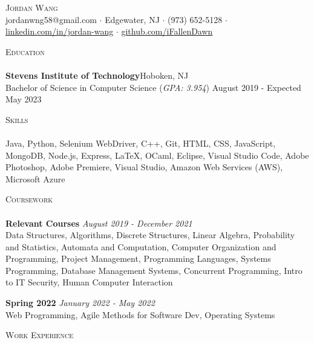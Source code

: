 \documentclass[10pt]{article}
\newcommand{\lineunder} {
    \vspace*{-8pt} \\
    \hspace*{-18pt} \hrulefill \\
}
\newcommand{\header} [1] {
    {\hspace*{-18pt}\vspace*{6pt} \textsc{#1}}
    \vspace*{-6pt} \lineunder
}
\begin{document}
\vspace*{-40pt}

    

\vspace*{2pt}
\begin{center}
	{\Huge \scshape {Jordan Wang}}\\
	\vspace{2mm}
	jordanwng58@gmail.com $\cdot$ Edgewater, NJ $\cdot$ (973) 652-5128 $\cdot$ \href{https://www.linkedin.com/in/jordan-wang/}{linkedin.com/in/jordan-wang} $\cdot$ \href{https://github.com/iFallenDawn}{github.com/iFallenDawn} \\
\end{center}
\header{Education}
\textbf{Stevens Institute of Technology}\hfill Hoboken, NJ\\
Bachelor of Science in Computer Science (\textit{GPA: 3.954}) \hfill August 2019 - Expected May 2023\\
\vspace{2mm}

\header{Skills}
	Java, Python, Selenium WebDriver, C++, Git, HTML, CSS, JavaScript, MongoDB, Node.js, Express, \LaTeX, OCaml, Eclipse, Visual Studio Code, Adobe Photoshop, Adobe Premiere, Visual Studio, Amazon Web Services (AWS), Microsoft Azure                    \\
\vspace{2mm}

\header{Coursework}
{\textbf{Relevant Courses}} {\sl August 2019 - December 2021} \hfill 
\\
Data Structures, Algorithms, Discrete Structures, Linear Algebra, Probability and Statistics, Automata and Computation, Computer Organization and Programming,  Project Management, Programming Languages, Systems Programming, Database Management Systems, Concurrent Programming, Intro to IT Security, Human Computer Interaction\\
\vspace*{2mm}

{\textbf{Spring 2022}} {\sl January 2022 - May 2022} \hfill 
\\
Web Programming, Agile Methods for Software Dev, Operating Systems\\
\vspace*{2mm}

\header{Work Experience}
\vspace{1mm}
\end{document}
